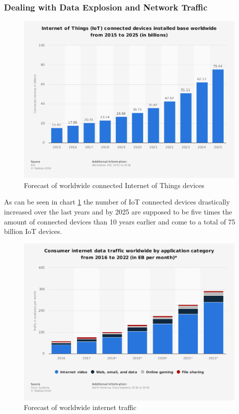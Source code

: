 \subsubsection{Dealing with Data Explosion and Network Traffic}\hspace*{\fill} \begin{figure}[h]
    \centering
    \includegraphics[width=1\textwidth,height=0.8\textwidth]{resources/images/global_iot_devices.png}
    \caption{Forecast of worldwide connected Internet of Things devices\cite{statista1}}
    \label{fig:global_iot_devices}
\end{figure}

As can be seen in chart \ref{fig:global_iot_devices} the number of IoT connected devices drastically increased over the last years and by 2025 are supposed to be five times the amount of connected devices than 10 years earlier and come to a total of 75 billion IoT devices.

\begin{figure}[H]
    \centering
    \includegraphics[width=1\textwidth,height=0.8\textwidth]{resources/images/global_traffic.png}
    \caption{Forecast of worldwide internet traffic\cite{statista2}}
    \label{fig:global_traffic}
\end{figure}


